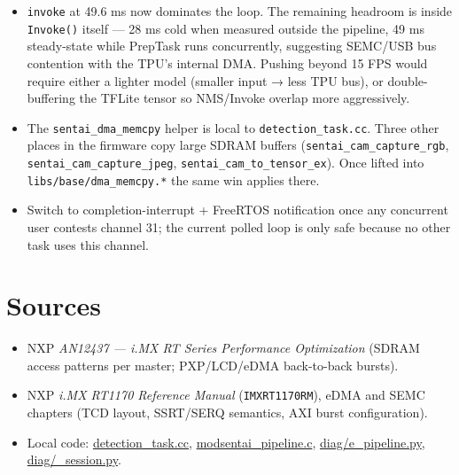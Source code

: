 \begin{itemize}
\tightlist
\item
  \texttt{invoke} at 49.6 ms now dominates the loop. The remaining
  headroom is inside \texttt{Invoke()} itself --- 28 ms cold when
  measured outside the pipeline, 49 ms steady-state while PrepTask runs
  concurrently, suggesting SEMC/USB bus contention with the TPU's
  internal DMA. Pushing beyond 15 FPS would require either a lighter
  model (smaller input → less TPU bus), or double-buffering the TFLite
  tensor so NMS/Invoke overlap more aggressively.
\item
  The \texttt{sentai\_dma\_memcpy} helper is local to
  \texttt{detection\_task.cc}. Three other places in the firmware copy
  large SDRAM buffers (\texttt{sentai\_cam\_capture\_rgb},
  \texttt{sentai\_cam\_capture\_jpeg},
  \texttt{sentai\_cam\_to\_tensor\_ex}). Once lifted into
  \texttt{libs/base/dma\_memcpy.*} the same win applies there.
\item
  Switch to completion-interrupt + FreeRTOS notification once any
  concurrent user contests channel 31; the current polled loop is only
  safe because no other task uses this channel.
\end{itemize}

\section{Sources}\label{sources}

\begin{itemize}
\tightlist
\item
  NXP \emph{AN12437 --- i.MX RT Series Performance Optimization} (SDRAM
  access patterns per master; PXP/LCD/eDMA back-to-back bursts).
\item
  NXP \emph{i.MX RT1170 Reference Manual} (\texttt{IMXRT1170RM}), eDMA
  and SEMC chapters (TCD layout, SSRT/SERQ semantics, AXI burst
  configuration).
\item
  Local code: \href{../detection_task.cc}{detection\_task.cc},
  \href{../modsentai_pipeline.c}{modsentai\_pipeline.c},
  \href{../diag/e_pipeline.py}{diag/e\_pipeline.py},
  \href{../diag/_session.py}{diag/\_session.py}.
\end{itemize}
